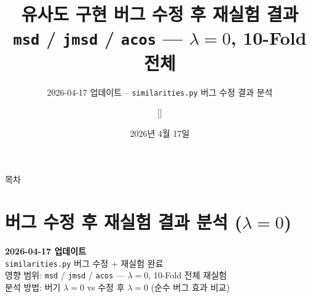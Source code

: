\documentclass[aspectratio=169,10pt]{beamer}
\title[버그 수정 후 재실험 결과]{유사도 구현 버그 수정 후 재실험 결과\\
			 \small \texttt{msd} / \texttt{jmsd} / \texttt{acos} --- $\lambda=0$, 10-Fold 전체}
\subtitle{2026-04-17 업데이트 -- \texttt{similarities.py} 버그 수정 결과 분석}
\author[발표자]{[]}
\institute{[]}
\date{2026년 4월 17일}
\begin{document}
\begin{frame}
	\titlepage
\end{frame}

\begin{frame}{목차}
	\tableofcontents[hideallsubsections]
\end{frame}

\section{버그 수정 후 재실험 결과 분석 ($\lambda=0$)}

\begin{frame}[plain]
	\begin{center}
		\vspace{1.8cm}
		{\LARGE \textbf{2026-04-17 업데이트}}\\[0.8em]
		{\large \texttt{similarities.py} 버그 수정 + 재실험 완료}\\[0.6em]
		{\normalsize 영향 범위: \texttt{msd} / \texttt{jmsd} / \texttt{acos} --- $\lambda=0$, 10-Fold 전체 재실험}\\[1em]
		{\small \textcolor{negred}{분석 방법: 버기 $\lambda=0$ vs 수정 후 $\lambda=0$ (순수 버그 효과 비교)}}
	\end{center}
\end{frame}
\end{document}
